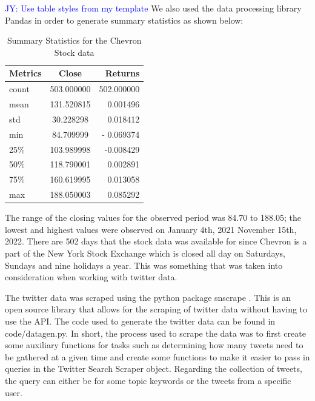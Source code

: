 \documentclass[12pt, letterpaper, titlepage]{article}
\newcommand{\jy}[1]{\textcolor{blue}{JY: #1}}
\begin{document}
\jy{Use table styles from my template}
We also used the data processing library Pandas in order to generate summary statistics as shown below:
\begin{table}[!hb]
  \begin{center}
    \caption{Summary Statistics for the Chevron Stock data}
    \label{tab:table1}
    \begin{tabular}{l|c|r} %
      \textbf{Metrics} & \textbf{Close} & \textbf{Returns}\\
      \hline
      count & 503.000000 & 502.000000\\
      mean & 131.520815 & 0.001496\\
      std & 30.228298 & 0.018412\\
      min & 84.709999	 & - 0.069374\\
      25\% & 103.989998 & -0.008429\\
      50\% & 118.790001 & 0.002891\\
      75\% & 160.619995 & 0.013058\\
      max & 188.050003 & 0.085292\\
    \end{tabular}
  \end{center}
\end{table}



The range of the closing values for the observed period was 84.70 to 188.05; the lowest and highest values were observed on January 4th, 2021 November 15th, 2022. There are 502 days that the stock data was available for since Chevron is a part of the New York Stock Exchange which is closed all day on Saturdays, Sundays and nine holidays a year. This was something that was taken into consideration when working with twitter data. 


The twitter data was scraped using the python package snscrape \citep{justanotherarchivist_2022}. This is an open source library that allows for the scraping of twitter data without having to use the API. The code used to generate the twitter data can be found in code/datagen.py. In short, the process used to scrape the data was to first create some auxiliary functions for tasks such as determining how many tweets need to be gathered at a given time and create some functions to make it easier to pass in queries in the Twitter Search Scraper object. Regarding the collection of tweets, the query can either be for some topic keywords or the tweets from a specific user. 
\end{document}
